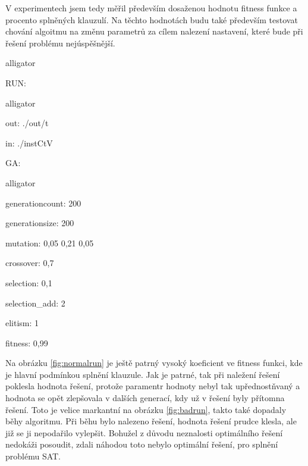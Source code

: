 \documentclass[11pt]{article}
\begin{document}
V experimentech jsem tedy měřil především dosaženou hodnotu fitness funkce a procento spl\-něných klauzulí. Na těchto hodnotách budu také především testovat chování algoitmu na změnu parametrů za cílem nalezení nastavení, které bude při řešení problému nejúspěšnější. 

\begin{labeling}{alligator}
\item[RUN:] 
\begin{labeling}{alligator}
\item[] 
\item[out:] ./out/t
\item[in:] ./instCtV
\end{labeling}
\item[GA:]
\begin{labeling}{alligator}
\item[] 
\item[generationcount:] 200
\item[generationsize:] 200
\item[mutation:] 0,05 0,21 0,05
\item[crossover:] 0,7
\item[selection:] 0,1
\item[selection\_add:] 2
\item[elitism:] 1
\item[fitness:] 0,99
\end{labeling}  
\end{labeling}
\pagestyle{plain}

Na obrázku \ref{fig:normalrun} je ještě patrný vysoký koeficient ve fitness funkci, kde je hlavní podmínkou splnění klauzule. Jak je patrné, tak při naležení řešení poklesla hodnota řešení, protože paramentr hodnoty nebyl tak upřednostňvaný a hodnota se opět zlepšovala v dalších generací, kdy už v řešení byly přítomna řešení. Toto je velice markantní na obrázku \ref{fig:badrun}, takto také dopadaly běhy algoritmu. Při běhu bylo nalezeno řešení, hodnota řešení prudce klesla, ale již se ji nepodařilo vylepšit. Bohužel z důvodu neznalosti optimálního řešení nedokáži posoudit, zdali náhodou toto nebylo optimální řešení, pro splnění problému SAT.
\end{document}
